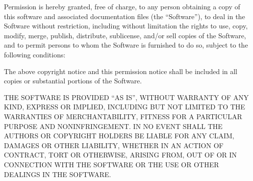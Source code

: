 \documentclass[letterpaper,10pt,english]{sphinxmanual}
\begin{document}
Permission is hereby granted, free of charge, to any person obtaining a copy of this software and associated
documentation files (the ``Software''), to deal in the Software without restriction, including without limitation
the rights to use, copy, modify, merge, publish, distribute, sublicense, and/or sell copies of the Software,
and to permit persons to whom the Software is furnished to do so, subject to the following conditions:

The above copyright notice and this permission notice shall be included in all copies or substantial portions of the Software.

THE SOFTWARE IS PROVIDED ``AS IS'', WITHOUT WARRANTY OF ANY KIND, EXPRESS OR IMPLIED, INCLUDING BUT NOT LIMITED TO THE
WARRANTIES OF MERCHANTABILITY, FITNESS FOR A PARTICULAR PURPOSE AND NONINFRINGEMENT. IN NO EVENT SHALL THE AUTHORS OR
COPYRIGHT HOLDERS BE LIABLE FOR ANY CLAIM, DAMAGES OR OTHER LIABILITY, WHETHER IN AN ACTION OF CONTRACT, TORT OR OTHERWISE,
ARISING FROM, OUT OF OR IN CONNECTION WITH THE SOFTWARE OR THE USE OR OTHER DEALINGS IN THE SOFTWARE.



\renewcommand{\indexname}{Index}
\printindex
\end{document}
